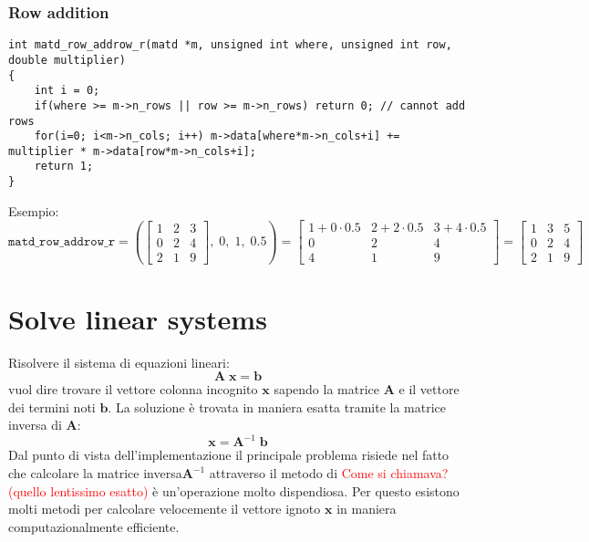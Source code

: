 \documentclass[10pt]{article}
\begin{document}
\subsubsection{Row addition}

\begin{lstlisting}
int matd_row_addrow_r(matd *m, unsigned int where, unsigned int row, double multiplier)
{
	int i = 0;
	if(where >= m->n_rows || row >= m->n_rows) return 0; // cannot add rows
	for(i=0; i<m->n_cols; i++) m->data[where*m->n_cols+i] += multiplier * m->data[row*m->n_cols+i];
	return 1;
}
\end{lstlisting}

Esempio:
\begin{equation*}
\mathtt{matd\_row\_addrow\_r} = \left( 
\begin{bmatrix}
1 & 2 & 3 \\ 0 & 2 & 4 \\ 2 & 1 & 9
\end{bmatrix}, \; 0, \; 1, \; 0.5
\right) = 
\begin{bmatrix}
1+0\cdot 0.5 & 2+2\cdot 0.5 & 3+4\cdot 0.5 \\
0 & 2 & 4 \\
4 & 1 & 9
\end{bmatrix} = 
\begin{bmatrix}
1 & 3 & 5 \\ 0 & 2 & 4 \\ 2 & 1 & 9
\end{bmatrix}
\end{equation*}



\section{Solve linear systems}

Risolvere il sistema di equazioni lineari:
\begin{equation}
\mathbf{A} \; \mathbf{x} = \mathbf{b}
\label{eq:lin_sys}
\end{equation}
vuol dire trovare il vettore colonna incognito $\mathbf{x}$ sapendo la matrice $\mathbf{A}$ e il vettore dei termini noti $\mathbf{b}$. La soluzione è trovata in maniera esatta tramite la matrice inversa di $\mathbf{A}$:
\begin{equation}
\mathbf{x} = \mathbf{A}^{-1} \; \mathbf{b}
\end{equation}
Dal punto di vista dell'implementazione il principale problema risiede nel fatto che calcolare la matrice inversa$\mathbf{A}^{-1}$ attraverso il metodo di \textcolor{red}{Come si chiamava? (quello lentissimo esatto)} è un'operazione molto dispendiosa.
Per questo esistono molti metodi per calcolare velocemente il vettore ignoto $\mathbf{x}$ in maniera computazionalmente efficiente.
\end{document}
